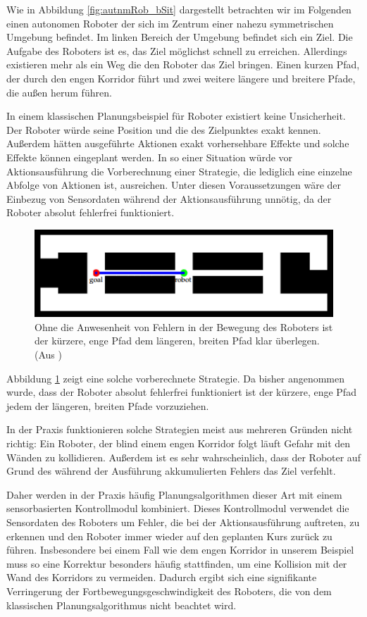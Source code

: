 \documentclass[a4paper]{IEEEtran}
\begin{document}
Wie in Abbildung \ref{fig:autnmRob_bSit} dargestellt betrachten wir im Folgenden einen autonomen Roboter der sich im Zentrum einer nahezu symmetrischen Umgebung befindet. Im linken Bereich der Umgebung befindet sich ein Ziel. Die Aufgabe des Roboters ist es, das Ziel möglichst schnell zu erreichen. Allerdings existieren mehr als ein Weg die den Roboter das Ziel bringen. Einen kurzen Pfad, der durch den engen Korridor führt und zwei weitere längere und breitere Pfade, die außen herum führen.

In einem klassischen Planungsbeispiel für Roboter existiert keine Unsicherheit. Der Roboter würde seine Position und die des Zielpunktes exakt kennen. Außerdem hätten ausgeführte Aktionen exakt vorhersehbare Effekte und solche Effekte können eingeplant werden. In so einer Situation würde vor Aktionsausführung die Vorberechnung einer Strategie, die lediglich eine einzelne Abfolge von Aktionen ist, ausreichen. Unter diesen Voraussetzungen wäre der Einbezug von Sensordaten während der Aktionsausführung unnötig, da der Roboter absolut fehlerfrei funktioniert.

\begin{figure}[ht]
	\centering
	\includegraphics[scale=0.72]{images/autnmRobot_directPath.png}
	\caption{Ohne die Anwesenheit von Fehlern in der Bewegung des Roboters ist der kürzere, enge Pfad dem längeren, breiten Pfad klar überlegen. (Aus \cite{thrun2005probabilistic})}
	\label{fig:autnmRob_dirPath}
\end{figure}

Abbildung \ref{fig:autnmRob_dirPath} zeigt eine solche vorberechnete Strategie. Da bisher angenommen wurde, dass der Roboter absolut fehlerfrei funktioniert ist der kürzere, enge Pfad jedem der längeren, breiten Pfade vorzuziehen.

In der Praxis funktionieren solche Strategien meist aus mehreren Gründen nicht richtig: Ein Roboter, der blind einem engen Korridor folgt läuft Gefahr mit den Wänden zu kollidieren. Außerdem ist es sehr wahrscheinlich, dass der Roboter auf Grund des während der Ausführung akkumulierten Fehlers das Ziel verfehlt.

Daher werden in der Praxis häufig Planungsalgorithmen dieser Art mit einem sensorbasierten Kontrollmodul kombiniert. Dieses Kontrollmodul verwendet die Sensordaten des Roboters um Fehler, die bei der Aktionsausführung auftreten, zu erkennen und den Roboter immer wieder auf den geplanten Kurs zurück zu führen. Insbesondere bei einem Fall wie dem engen Korridor in unserem Beispiel muss so eine Korrektur besonders häufig stattfinden, um eine Kollision mit der Wand des Korridors zu vermeiden. Dadurch ergibt sich eine signifikante Verringerung der Fortbewegungsgeschwindigkeit des Roboters, die von dem klassischen Planungsalgorithmus nicht beachtet wird. 
\end{document}
